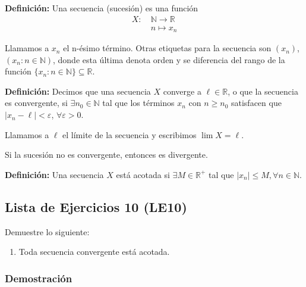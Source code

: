 \documentclass[11pt]{article}
\newcommand{\N}{\mathbb{N}}
\newcommand{\R}{\mathbb{R}}
\let\epsilon\varepsilon
\begin{document}
\textbf{Definición:} Una secuencia (sucesión) es una función %
\begin{align*}
    X: \ & \N \to \R \\
    \ &  n \mapsto x_n 
\end{align*}

Llamamos a $x_n$ el n-ésimo término. Otras etiquetas para la secuencia son $(x_n)$, $(x_n:n\in \N)$, donde esta última denota orden y se diferencia del rango de la función $\{x_n:n\in \N\}\subseteq \R$.

\textbf{Definición:} Decimos que una secuencia $X$ converge a $\ell \in \R$, o que la secuencia es convergente, si $\exists n_0\in \N$ tal que los términos $x_n$ con $n\geq n_0$ satisfacen que $|x_n-\ell|<\epsilon$, $\forall \epsilon>0$.

Llamamos a $\ell$ el límite de la secuencia y escribimos $\lim X = \ell$.

Si la sucesión no es convergente, entonces es divergente.

\textbf{Definición:} Una secuencia $X$ está acotada si $\exists M\in \R^+$ tal que $|x_n|\leq M, \forall n\in \N$.

\subsection*{Lista de Ejercicios 10 (LE10)}

Demuestre lo siguiente:

\begin{enumerate}[label=\alph*),font=\bfseries]
    \item Toda secuencia convergente está acotada.
\end{enumerate}

\subsubsection*{Demostración}
\end{document}
